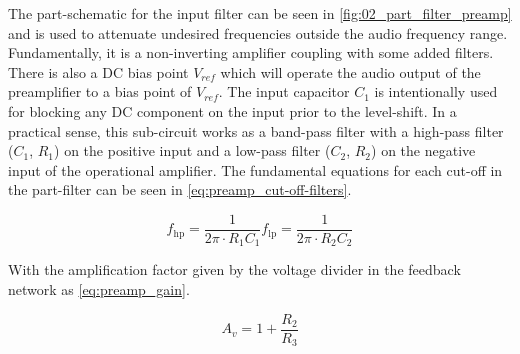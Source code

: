 The part-schematic for the input filter can be seen in \autoref{fig:02_part_filter_preamp} and is used to attenuate undesired frequencies outside the audio frequency range. Fundamentally, it is a non-inverting amplifier coupling with some added filters. There is also a DC bias point $V_{ref}$ which will operate the audio output of the preamplifier to a bias point of $V_{ref}$. The input capacitor $C_{1}$ is intentionally used for blocking any DC component on the input prior to the level-shift. In a practical sense, this sub-circuit works as a band-pass filter with a high-pass filter ($C_{1}$, $R_{1}$) on the positive input and a low-pass filter ($C_{2}$, $R_{2}$) on the negative input of the operational amplifier. The fundamental equations for each cut-off in the part-filter can be seen in \autoref{eq:preamp_cut-off-filters}.

\begin{subequations} \label{eq:preamp_cut-off-filters}
	\begin{equation} \label{eq:preamp_cut-off-filtersa}
		f_{\mathrm{hp}} = \frac{1}{2 \pi \cdot R_{1}C_{1}}
	\end{equation}
	\begin{equation} \label{eq:preamp_cut-off-filtersb}
		f_{\mathrm{lp}} = \frac{1}{2 \pi \cdot R_{2}C_{2}}
	\end{equation}
\end{subequations}

With the amplification factor given by the voltage divider in the feedback network as \autoref{eq:preamp_gain}.

\begin{equation} \label{eq:preamp_gain}
	A_{v} = 1 + \frac{R_{2}}{R_{3}}
\end{equation}

